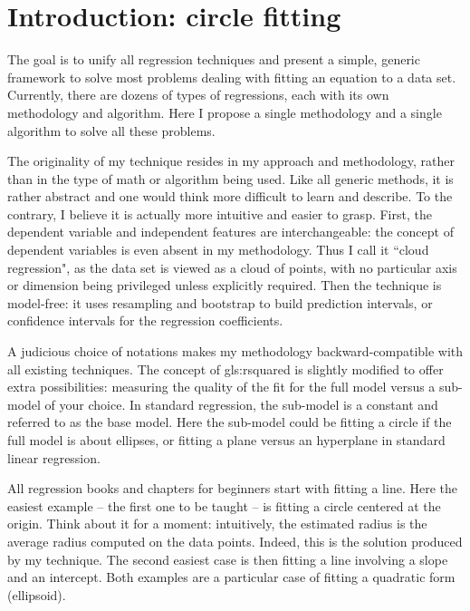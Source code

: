 \documentclass[oneside,10pt]{book}
\begin{document}
\hypersetup{linkcolor=red}



\section{Introduction: circle fitting}\label{circ1}

The goal is to unify all regression techniques and present a simple, generic  framework to solve
 most problems dealing with fitting an equation to a data set. Currently, there are dozens of types of regressions, each with its own
 methodology and algorithm. Here I propose a single methodology and a single algorithm to solve all these problems.

The originality of my technique resides in my approach and methodology, rather than in the type of math or algorithm being used. Like all generic methods, it is rather abstract and  one would think more difficult to learn and describe. To the contrary, I believe it is
 actually more intuitive and easier to grasp. First,
 the dependent variable and independent features are interchangeable: the concept of dependent variables is even absent in my methodology. Thus I call it ``cloud regression", as the data set is viewed as a cloud of points, with no particular axis or dimension being privileged unless explicitly required.
 Then the technique is model-free: it uses resampling and bootstrap to build prediction intervals, or confidence intervals for the
 regression coefficients.

A judicious choice of notations makes my methodology backward-compatible with all existing techniques. The concept of \gls{gls:rsquared} is slightly modified
 to offer extra possibilities: measuring the quality of the fit for the full model versus a sub-model of your choice.
 In standard regression, the sub-model is a constant and referred to as the base model. Here the sub-model could be fitting a circle if the full model
 is about ellipses, or fitting a plane versus an hyperplane in standard linear regression.

All regression books and chapters for beginners start with fitting a line. Here the easiest example -- the first one to be taught -- is fitting a circle centered at the origin. Think about it for a moment: intuitively, the estimated radius is the average radius computed on the data points. Indeed, this is the solution
 produced by my technique. The second easiest case is then fitting a line involving a slope and an intercept. Both examples are a particular case of fitting a quadratic form (ellipsoid).
\end{document}

